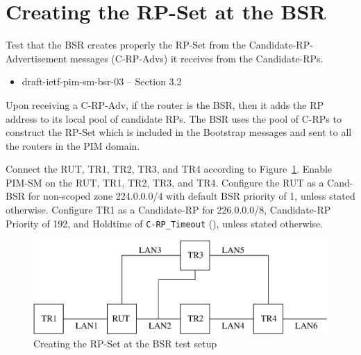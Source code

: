 \documentclass[11pt]{report}
\begin{document}
\newpage
\section{Creating the RP-Set at the BSR}

Test that the BSR creates properly the RP-Set from the
Candidate-RP-Advertisement messages (C-RP-Advs) it receives from the
Candidate-RPs.


\begin{itemize}
  \item draft-ietf-pim-sm-bsr-03 -- Section 3.2
\end{itemize}

Upon receiving a C-RP-Adv, if the router is the BSR, then it adds the RP
address to its local pool of candidate RPs. The BSR uses the pool of C-RPs to
construct the RP-Set which is included in the Bootstrap messages and sent to
all the routers in the PIM domain.

Connect the RUT, TR1, TR2, TR3, and TR4 according to
Figure~\ref{fig:pim_test_6_4_creating_the_rp_set_at_the_bsr}.
Enable PIM-SM on the RUT, TR1, TR2, TR3, and TR4. Configure the RUT
as a Cand-BSR for non-scoped zone 224.0.0.0/4 with default BSR
priority of 1, unless stated otherwise.
Configure TR1 as a Candidate-RP for 226.0.0.0/8, Candidate-RP Priority
of 192, and Holdtime of \verb=C-RP_Timeout= ({\PimsmCRPTimeout}), unless stated
otherwise.


\begin{figure}[htbp]
  \begin{center}
    \includegraphics[scale=0.8]{figs/pim_test_6_4_creating_the_rp_set_at_the_bsr}
    \caption{Creating the RP-Set at the BSR test setup}
    \label{fig:pim_test_6_4_creating_the_rp_set_at_the_bsr}
  \end{center}
\end{figure}


\end{document}
